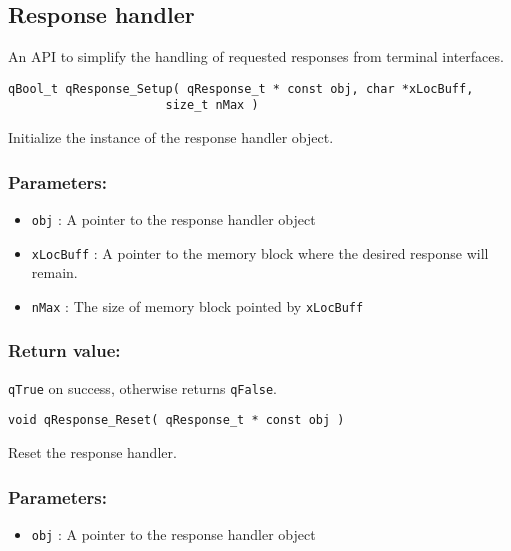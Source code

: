\subsection{Response handler}

An API to simplify the handling of requested responses from terminal interfaces.
\medskip

\begin{lstlisting}[style=CStyle]
qBool_t qResponse_Setup( qResponse_t * const obj, char *xLocBuff, 
                      size_t nMax )
\end{lstlisting}

Initialize the instance of the response handler object. 

\subsubsection*{Parameters:}
\begin{itemize}
    \item \lstinline{obj} : A pointer to the response handler object
    \item \lstinline{xLocBuff} : A pointer to the memory block where the desired response will remain.
    \item \lstinline{nMax} : The size of memory block pointed by \lstinline{xLocBuff}
\end{itemize}

\subsubsection*{Return value:}
\lstinline{qTrue} on success, otherwise returns \lstinline{qFalse}.

\noindent\hrulefill

\begin{lstlisting}[style=CStyle]
void qResponse_Reset( qResponse_t * const obj )
\end{lstlisting}

Reset the response handler. 

\subsubsection*{Parameters:}
\begin{itemize}
    \item \lstinline{obj} : A pointer to the response handler object
\end{itemize}

